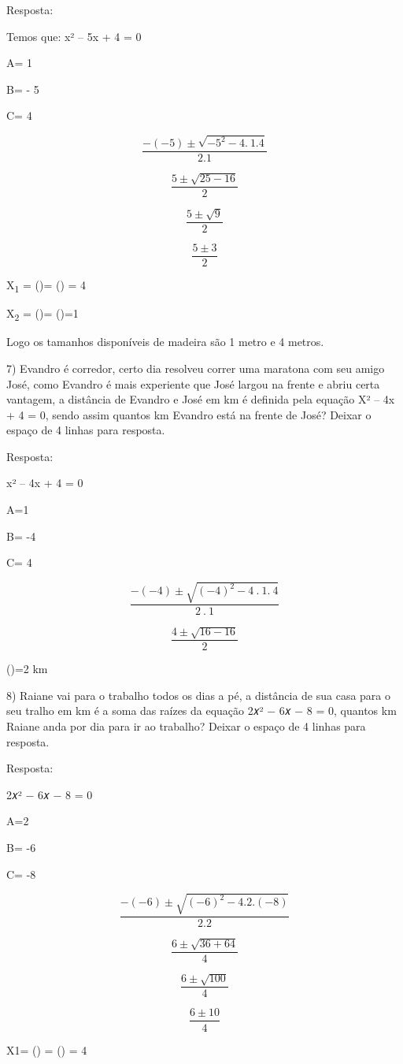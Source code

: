 Resposta:

Temos que: x² -- 5x + 4 = 0

A= 1

B= - 5

C= 4

\[\frac{- ( - 5) \pm \sqrt{{- 5}^{2} - 4.\ 1.4}}{2.1}\]

\[\frac{5 \pm \sqrt{25 - 16}}{2}\]

\[\frac{5 \pm \sqrt{9}}{2}\]

\[\frac{5 \pm 3}{2}\]

X\textsubscript{1} = ()= () = 4

X\textsubscript{2} = ()= ()=1

Logo os tamanhos disponíveis de madeira são 1 metro e 4 metros.

7) Evandro é corredor, certo dia resolveu correr uma maratona com seu
amigo José, como Evandro é mais experiente que José largou na frente e
abriu certa vantagem, a distância de Evandro e José em km é definida
pela equação X² -- 4x + 4 = 0, sendo assim quantos km Evandro está na
frente de José? Deixar o espaço de 4 linhas para resposta.

Resposta:

x² -- 4x + 4 = 0

A=1

B= -4

C= 4

\[\frac{- ( - 4) \pm \sqrt{{( - 4)}^{2} - 4\ .\ 1.\ 4}}{2\ .\ 1}\]

\[\frac{4 \pm \sqrt{16 - 16}}{2}\]

()=2 km

8) Raiane vai para o trabalho todos os dias a pé, a distância de sua
casa para o seu tralho em km é a soma das raízes da equação 2𝑥² − 6𝑥 − 8
= 0, quantos km Raiane anda por dia para ir ao trabalho? Deixar o espaço
de 4 linhas para resposta.

Resposta:

2𝑥² − 6𝑥 − 8 = 0

A=2

B= -6

C= -8

\[\frac{- ( - 6) \pm \sqrt{{( - 6)}^{2} - 4.2.( - 8)}}{2.2}\]

\[\frac{6 \pm \sqrt{36 + 64}}{4}\]

\[\frac{6 \pm \sqrt{100}}{4}\]

\[\frac{6 \pm 10}{4}\]

X1= () = () = 4

